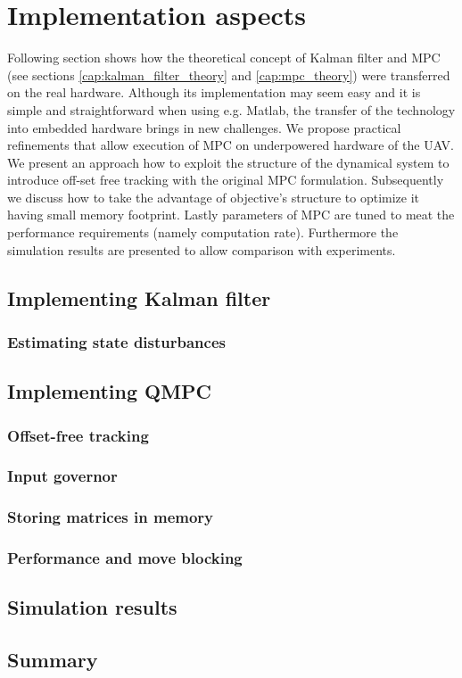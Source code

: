 \section{Implementation aspects}
\label{cap:Implementation}

Following section shows how the theoretical concept of Kalman filter and MPC (see sections \ref{cap:kalman_filter_theory} and \ref{cap:mpc_theory}) were transferred on the real hardware. Although its implementation may seem easy and it is simple and straightforward when using e.g. Matlab, the transfer of the technology into embedded hardware brings in new challenges. We propose practical refinements that allow execution of MPC on underpowered hardware of the UAV. We present an approach how to exploit the structure of the dynamical system to introduce off-set free tracking with the original MPC formulation. Subsequently we discuss how to take the advantage of objective's structure to optimize it having small memory footprint. Lastly parameters of MPC are tuned to meat the performance requirements (namely computation rate). Furthermore the simulation results are presented to allow comparison with experiments.



\subsection{Implementing Kalman filter}



\subsubsection{Estimating state disturbances}

\subsection{Implementing QMPC}

\subsubsection{Offset-free tracking}

\subsubsection{Input governor}

\subsubsection{Storing matrices in memory}

\subsubsection{Performance and move blocking}
\label{cap:implementation_performance}

\subsection{Simulation results}

\subsection{Summary}
